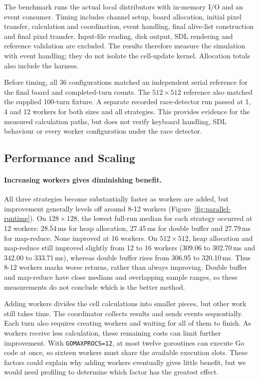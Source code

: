 \documentclass[10pt,a4paper,twocolumn]{article}
\begin{document}
The benchmark runs the actual local distributors with in-memory I/O and an
event consumer. Timing includes channel setup, board allocation, initial
pixel transfer, calculation and coordination, event handling, final alive-list
construction and final pixel transfer. Input-file reading, disk output, SDL
rendering and reference validation are excluded. The results therefore
measure the simulation with event handling; they do not isolate the
cell-update kernel. Allocation totals also include the harness.

Before timing, all 36 configurations matched an independent serial reference
for the final board and completed-turn counts. The $512\times512$ reference
also matched the supplied 100-turn fixture. A separate recorded race-detector
run passed at 1, 4 and 12 workers for both sizes and all strategies. This
provides evidence for the measured calculation paths, but does not verify
keyboard handling, SDL behaviour or every worker configuration under the
race detector.

\subsection{Performance and Scaling}

\paragraph{Increasing workers gives diminishing benefit.}
All three strategies become substantially faster as workers are added, but
improvement generally levels off around 8-12 workers
(Figure~\ref{fig:parallel-runtime}). On $128\times128$, the lowest full-run
median for each strategy occurred at 12 workers: 28.54\,ms for heap
allocation, 27.45\,ms for double buffer and 27.79\,ms for map-reduce.
None improved at 16 workers. On $512\times512$, heap allocation and
map-reduce still improved slightly from 12 to 16 workers (309.06 to
302.70\,ms and 342.00 to 333.71\,ms), whereas double buffer rises
from 306.95 to 320.10\,ms. Thus 8-12 workers marks worse returns,
rather than always improving. Double buffer and map-reduce have close
medians and overlapping sample ranges, so these measurements do not
conclude which is the better method.

Adding workers divides the cell calculations into smaller pieces, but other
work still takes time. The coordinator collects results and sends events
sequentially. Each turn also requires creating workers and waiting for all
of them to finish. As workers receive less calculation, these remaining
costs can limit further improvement. With \texttt{GOMAXPROCS=12}, at most
twelve goroutines can execute Go code at once, so sixteen workers must
share the available execution slots. These factors could explain why
adding workers eventually gives little benefit, but we would need profiling
to determine which factor has the greatest effect.
\end{document}
